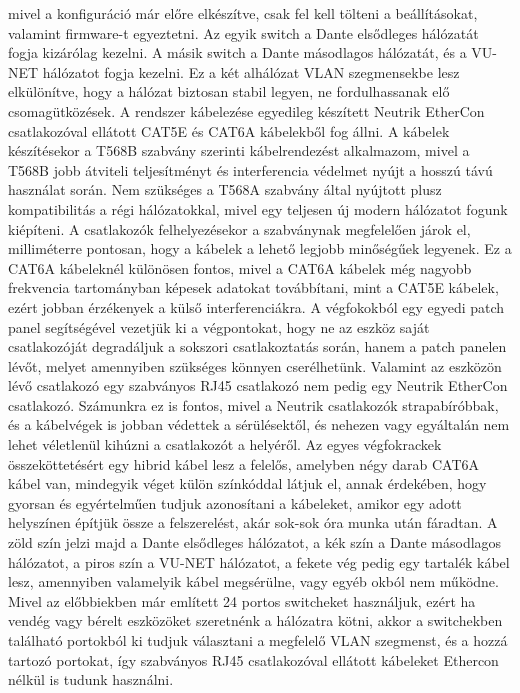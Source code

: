 mivel a konfiguráció már előre elkészítve, csak fel kell tölteni a beállításokat, valamint firmware-t egyeztetni.
Az egyik switch a Dante elsődleges hálózatát fogja kizárólag kezelni.
A másik switch a Dante másodlagos hálózatát, és a VU-NET hálózatot fogja kezelni.
Ez a két alhálózat VLAN szegmensekbe lesz elkülönítve, hogy a hálózat biztosan stabil legyen, ne fordulhassanak elő csomagütközések.
A rendszer kábelezése egyedileg készített Neutrik EtherCon csatlakozóval ellátott CAT5E és CAT6A kábelekből fog állni.
A kábelek készítésekor a T568B szabvány szerinti kábelrendezést alkalmazom, mivel a T568B jobb átviteli
teljesítményt és interferencia védelmet nyújt a hosszú távú használat során.
Nem szükséges a T568A szabvány által nyújtott plusz kompatibilitás a régi hálózatokkal, mivel egy teljesen új 
modern hálózatot fogunk kiépíteni. 
A csatlakozók felhelyezésekor a szabványnak megfelelően járok el, milliméterre pontosan, hogy a kábelek
a lehető legjobb minőségűek legyenek. Ez a CAT6A kábeleknél különösen fontos, mivel a CAT6A kábelek
még nagyobb frekvencia tartományban képesek adatokat továbbítani, mint a CAT5E kábelek,
ezért jobban érzékenyek a külső interferenciákra.
A végfokokból egy egyedi patch panel segítségével vezetjük ki a végpontokat, hogy ne az eszköz saját csatlakozóját
degradáljuk a sokszori csatlakoztatás során, hanem a patch panelen lévőt, melyet amennyiben szükséges könnyen cserélhetünk.
Valamint az eszközön lévő csatlakozó egy szabványos RJ45 csatlakozó nem pedig egy Neutrik EtherCon csatlakozó.
Számunkra ez is fontos, mivel a Neutrik csatlakozók strapabíróbbak, és a kábelvégek is jobban védettek a sérülésektől,
és nehezen vagy egyáltalán nem lehet véletlenül kihúzni a csatlakozót a helyéről.
Az egyes végfokrackek összeköttetésért egy hibrid kábel lesz a felelős, amelyben négy darab CAT6A kábel van,
mindegyik véget külön színkóddal látjuk el, annak érdekében, hogy gyorsan és egyértelműen tudjuk azonosítani a kábeleket,
amikor egy adott helyszínen építjük össze a felszerelést, akár sok-sok óra munka után fáradtan.
A zöld szín jelzi majd a Dante elsődleges hálózatot, a kék szín a Dante másodlagos hálózatot, a piros szín a VU-NET hálózatot,
a fekete vég pedig egy tartalék kábel lesz, amennyiben valamelyik kábel megsérülne, vagy egyéb okból nem működne.
Mivel az előbbiekben már említett 24 portos switcheket használjuk, ezért ha vendég vagy bérelt eszközöket szeretnénk a hálózatra kötni,
akkor a switchekben található portokból ki tudjuk választani a megfelelő VLAN szegmenst, és a hozzá tartozó portokat,
így szabványos RJ45 csatlakozóval ellátott kábeleket Ethercon nélkül is tudunk használni.

